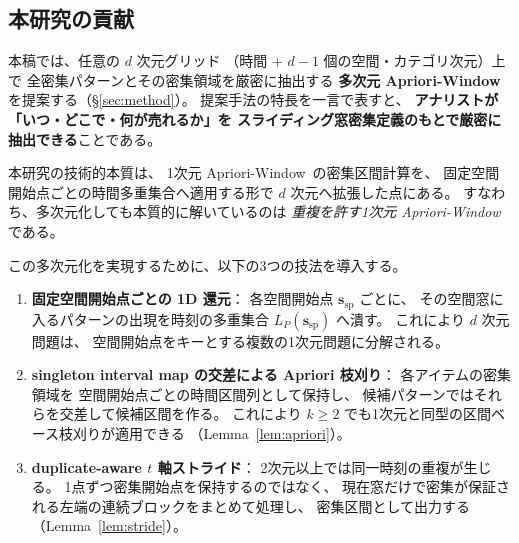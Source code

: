 \subsection{本研究の貢献}

本稿では、任意の $d$ 次元グリッド
（時間 + $d{-}1$ 個の空間・カテゴリ次元）上で
全密集パターンとその密集領域を厳密に抽出する
\textbf{多次元 Apriori-Window}を提案する（\S\ref{sec:method}）。
提案手法の特長を一言で表すと、
\textbf{アナリストが「いつ・どこで・何が売れるか」を
スライディング窓密集定義のもとで厳密に抽出できる}ことである。

本研究の技術的本質は、
1次元 Apriori-Window~\cite{aprioriwindow}の密集区間計算を、
固定空間開始点ごとの時間多重集合へ適用する形で
$d$ 次元へ拡張した点にある。
すなわち、多次元化しても本質的に解いているのは
\emph{重複を許す1次元 Apriori-Window} である。

この多次元化を実現するために、以下の3つの技法を導入する。

\begin{enumerate}
\item \textbf{固定空間開始点ごとの 1D 還元}：
各空間開始点 $\bm{s}_{\mathrm{sp}}$ ごとに、
その空間窓に入るパターンの出現を時刻の多重集合
$L_P(\bm{s}_{\mathrm{sp}})$ へ潰す。
これにより $d$ 次元問題は、
空間開始点をキーとする複数の1次元問題に分解される。

\item \textbf{singleton interval map の交差による Apriori 枝刈り}：
各アイテムの密集領域を
空間開始点ごとの時間区間列として保持し、
候補パターンではそれらを交差して候補区間を作る。
これにより $k \geq 2$ でも1次元と同型の区間ベース枝刈りが適用できる
（Lemma~\ref{lem:apriori}）。

\item \textbf{duplicate-aware $t$ 軸ストライド}：
2次元以上では同一時刻の重複が生じる。
1点ずつ密集開始点を保持するのではなく、
現在窓だけで密集が保証される左端の連続ブロックをまとめて処理し、
密集区間として出力する（Lemma~\ref{lem:stride}）。
\end{enumerate}
